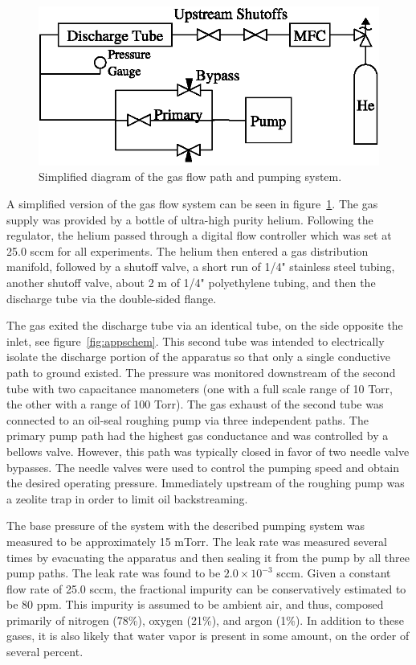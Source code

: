 \begin{figure}
  \centering
  \includegraphics{./chapters/experiment/figures/pump.eps}
  \caption{Simplified diagram of the gas flow path and pumping system.}
  \label{fig:pump}
\end{figure}
A simplified version of the gas flow system can be seen in
figure~\ref{fig:pump}. The gas supply was provided by a bottle of ultra-high
purity helium. Following the regulator, the helium passed through a digital flow
controller which was set at 25.0 sccm for all experiments. The helium then
entered a gas distribution manifold, followed by a shutoff valve, a short run of
1/4" stainless steel tubing, another shutoff valve, about 2 m of 1/4"
polyethylene tubing, and then the discharge tube via the double-sided flange. 

The gas exited the discharge tube via an identical tube, on the side opposite
the inlet, see figure~\ref{fig:appschem}. This second tube was intended to
electrically isolate the discharge portion of the apparatus so that only a
single conductive path to ground existed. The pressure was monitored downstream
of the second tube with two capacitance manometers (one with a full scale range
of 10 Torr, the other with a range of 100 Torr). The gas exhaust of the second
tube was connected to an oil-seal roughing pump via three independent paths. The
primary pump path had the highest gas conductance and was controlled by a
bellows valve. However, this path was typically closed in favor of two needle
valve bypasses. The needle valves were used to control the pumping speed and
obtain the desired operating pressure. Immediately upstream of the roughing pump
was a zeolite trap in order to limit oil backstreaming.

The base pressure of the system with the described pumping system was measured
to be approximately 15 mTorr. The leak rate was measured several times by
evacuating the apparatus and then sealing it from the pump by all three pump
paths. The leak rate was found to be $2.0\times 10^{-3}$ sccm. Given a constant
flow rate of 25.0 sccm, the fractional impurity can be conservatively estimated
to be 80 ppm. This impurity is assumed to be ambient air, and thus, composed
primarily of nitrogen (78\%), oxygen (21\%), and argon (1\%). In addition to
these gases, it is also likely that water vapor is present in some amount, on
the order of several percent.

